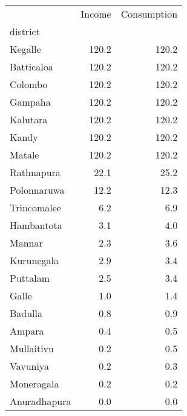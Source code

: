 \begin{tabular}{lrr}
\toprule
{} &  Income &  Consumption \\
district     &         &              \\
\midrule
Kegalle      &   120.2 &        120.2 \\
Batticaloa   &   120.2 &        120.2 \\
Colombo      &   120.2 &        120.2 \\
Gampaha      &   120.2 &        120.2 \\
Kalutara     &   120.2 &        120.2 \\
Kandy        &   120.2 &        120.2 \\
Matale       &   120.2 &        120.2 \\
Rathnapura   &    22.1 &         25.2 \\
Polonnaruwa  &    12.2 &         12.3 \\
Trincomalee  &     6.2 &          6.9 \\
Hambantota   &     3.1 &          4.0 \\
Mannar       &     2.3 &          3.6 \\
Kurunegala   &     2.9 &          3.4 \\
Puttalam     &     2.5 &          3.4 \\
Galle        &     1.0 &          1.4 \\
Badulla      &     0.8 &          0.9 \\
Ampara       &     0.4 &          0.5 \\
Mullaitivu   &     0.2 &          0.5 \\
Vavuniya     &     0.2 &          0.3 \\
Moneragala   &     0.2 &          0.2 \\
Anuradhapura &     0.0 &          0.0 \\
\bottomrule
\end{tabular}
